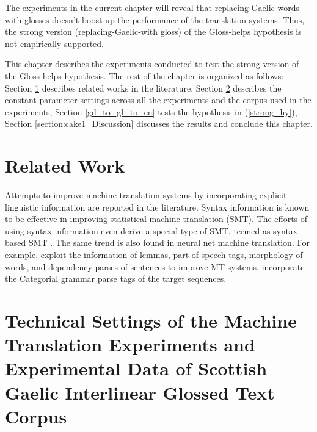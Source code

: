 \documentclass[final]{ua-thesis}
\numberwithin{equation}{section}
\begin{document}
The experiments in the current chapter will reveal that replacing Gaelic words with glosses doesn't boost up the performance of the translation systems. Thus, the strong version (replacing-Gaelic-with gloss) of the Gloss-helps hypothesis is not empirically supported. 

This chapter describes the experiments conducted to test the strong version of the Gloss-helps hypothesis.
The rest of the chapter is organized as follows: Section \ref{relate_work} describes related works in the literature, Section \ref{sec:experimet_setting} describes the constant parameter settings across all the experiments and the corpus used in the experiments, Section \ref{gd_to_gl_to_en} tests the hypothesis in (\ref{strong_hy}), Section \ref{section:cake1_Discussion} discusses the results and conclude this chapter.
\section{Related Work}\label{relate_work}
Attempts to improve machine translation systems by incorporating explicit linguistic information are reported in the literature. Syntax information is known to be effective in improving statistical machine translation (SMT). The efforts of using syntax information even derive a special type of SMT, termed as syntax-based SMT \citep{williams2016syntax}. The same trend is also found in neural net machine translation. For example, \citet{sennrich2016linguistic} exploit the information of lemmas, part of speech tags, morphology of words, and dependency parses of sentences to improve MT systems. \citet{ccg_target_seq} incorporate the Categorial grammar parse tags of the target sequences.


\section{Technical Settings of the Machine Translation Experiments and Experimental Data of Scottish Gaelic Interlinear Glossed Text Corpus}\label{sec:experimet_setting}
\end{document}
